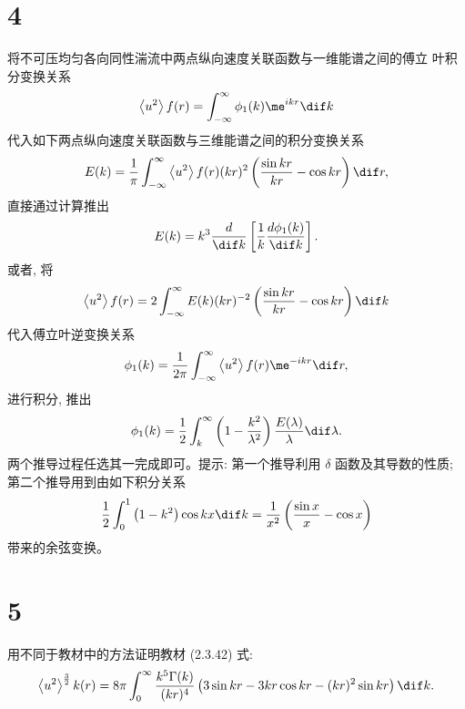 \documentclass[12pt,a4]{ctexart}
\begin{document}
\section{4}
将不可压均匀各向同性湍流中两点纵向速度关联函数与一维能谱之间的傅立 叶积分变换关系
\begin{equation}
   \left\langle u^{2}\right\rangle f(r)=\int_{-\infty}^{\infty} \phi_{1}(k) \me^{i k r}\dif k
\end{equation}
代入如下两点纵向速度关联函数与三维能谱之间的积分变换关系
\begin{equation}
   E(k)=\frac{1}{\pi} \int_{-\infty}^{\infty}\left\langle u^{2}\right\rangle f(r)(k r)^{2}\left(\frac{\sin k r}{k r}-\cos k r\right) \dif r,
\end{equation}
直接通过计算推出
\begin{equation}
   E(k)=k^{3} \frac{d}{\dif k}\left[\frac{1}{k} \frac{d \phi_{1}(k)}{\dif k}\right].
\end{equation}
或者, 将
\begin{equation}
   \left\langle u^{2}\right\rangle f(r)=2 \int_{-\infty}^{\infty} E(k)(k r)^{-2}\left(\frac{\sin k r}{k r}-\cos k r\right)\dif k
\end{equation}
代入傅立叶逆变换关系
\begin{equation}
   \phi_{1}(k)=\frac{1}{2 \pi} \int_{-\infty}^{\infty}\left\langle u^{2}\right\rangle f(r) \me^{-i k r} \dif r,
\end{equation}
进行积分, 推出
\begin{equation}
   \phi_{1}(k)=\frac{1}{2} \int_{k}^{\infty}\left(1-\frac{k^{2}}{\lambda^{2}}\right) \frac{E(\lambda)}{\lambda} \dif \lambda.
\end{equation}
两个推导过程任选其一完成即可。提示: 第一个推导利用 $\delta$ 函数及其导数的性质; 第二个推导用到由如下积分关系
\begin{equation}
   \frac{1}{2} \int_{0}^{1}\left(1-k^{2}\right) \cos k x \dif k=\frac{1}{x^{2}}\left(\frac{\sin x}{x}-\cos x\right)
\end{equation}
带来的余弦变换。


\section{5}

用不同于教材中的方法证明教材 (2.3.42) 式:
\begin{equation}
   \left\langle u^{2}\right\rangle^{\frac{3}{2}} k(r)=8 \pi \int_{0}^{\infty} \frac{k^{5} \Gamma(k)}{(k r)^{4}}\left(3 \sin k r-3 k r \cos k r-(k r)^{2} \sin k r\right)\dif k.
\end{equation}
\end{document}

